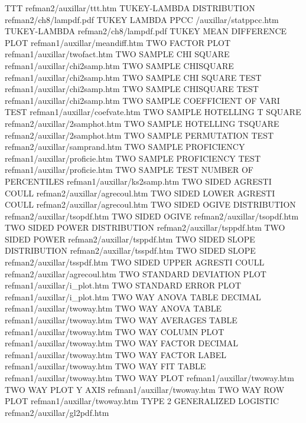 TTT                                     refman2/auxillar/ttt.htm
TUKEY-LAMBDA DISTRIBUTION               refman2/ch8/lampdf.pdf
TUKEY LAMBDA PPCC                       /auxillar/statppcc.htm
TUKEY-LAMBDA                            refman2/ch8/lampdf.pdf
TUKEY MEAN DIFFERENCE PLOT              refman1/auxillar/meandiff.htm
TWO FACTOR PLOT                         refman1/auxillar/twofact.htm
TWO SAMPLE CHI SQUARE                   refman1/auxillar/chi2samp.htm
TWO SAMPLE CHISQUARE                    refman1/auxillar/chi2samp.htm
TWO SAMPLE CHI SQUARE TEST              refman1/auxillar/chi2samp.htm
TWO SAMPLE CHISQUARE TEST               refman1/auxillar/chi2samp.htm
TWO SAMPLE COEFFICIENT OF VARI TEST     refman1/auxillar/coefvate.htm
TWO SAMPLE HOTELLING T SQUARE           refman2/auxillar/2samphot.htm
TWO SAMPLE HOTELLING TSQUARE            refman2/auxillar/2samphot.htm
TWO SAMPLE PERMUTATION TEST             refman2/auxillar/samprand.htm
TWO SAMPLE PROFICIENCY                  refman1/auxillar/proficie.htm
TWO SAMPLE PROFICIENCY TEST             refman1/auxillar/proficie.htm
TWO SAMPLE TEST NUMBER OF PERCENTILES   refman1/auxillar/ks2samp.htm
TWO SIDED AGRESTI COULL                 refman2/auxillar/agrecoul.htm
TWO SIDED LOWER AGRESTI COULL           refman2/auxillar/agrecoul.htm
TWO SIDED OGIVE DISTRIBUTION            refman2/auxillar/tsopdf.htm
TWO SIDED OGIVE                         refman2/auxillar/tsopdf.htm
TWO SIDED POWER DISTRIBUTION            refman2/auxillar/tsppdf.htm
TWO SIDED POWER                         refman2/auxillar/tsppdf.htm
TWO SIDED SLOPE DISTRIBUTION            refman2/auxillar/tsspdf.htm
TWO SIDED SLOPE                         refman2/auxillar/tsspdf.htm
TWO SIDED UPPER AGRESTI COULL           refman2/auxillar/agrecoul.htm
TWO STANDARD DEVIATION PLOT             refman1/auxillar/i_plot.htm
TWO STANDARD ERROR PLOT                 refman1/auxillar/i_plot.htm
TWO WAY ANOVA TABLE DECIMAL             refman1/auxillar/twoway.htm
TWO WAY ANOVA TABLE                     refman1/auxillar/twoway.htm
TWO WAY AVERAGES TABLE                  refman1/auxillar/twoway.htm
TWO WAY COLUMN PLOT                     refman1/auxillar/twoway.htm
TWO WAY FACTOR DECIMAL                  refman1/auxillar/twoway.htm
TWO WAY FACTOR LABEL                    refman1/auxillar/twoway.htm
TWO WAY FIT TABLE                       refman1/auxillar/twoway.htm
TWO WAY PLOT                            refman1/auxillar/twoway.htm
TWO WAY PLOT Y AXIS                     refman1/auxillar/twoway.htm
TWO WAY ROW PLOT                        refman1/auxillar/twoway.htm
TYPE 2 GENERALIZED LOGISTIC             refman2/auxillar/gl2pdf.htm
